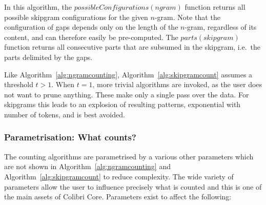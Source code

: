 \documentclass[a4paper,12pt]{article}
\begin{document}
In this algorithm, the $possibleConfigurations(ngram)$ function returns
all possible skipgram configurations for the given $n$-gram. Note that
the configuration of gaps depends only on the length of the $n$-gram, regardless
of its content, and can therefore easily be pre-computed. The
$parts(skipgram)$ function returns all consecutive parts that are
subsumed in the skipgram, i.e.\ the parts delimited by the gaps.

Like Algorithm~\ref{alg:ngramcounting}, Algorithm~\ref{alg:skipgramcount}
assumes a threshold $t>1$. When $t=1$, more trivial algorithms are
invoked, as the user does not want to prune anything. These make only a single
pass over the data. For skipgrams this leads to an explosion of
resulting patterns, exponential with number of tokens, and is best avoided.

\subsubsection{Parametrisation: What counts?}
\label{sec:whatcounts}

The counting algorithms are parametrised by a various other parameters which
are not shown in Algorithm~\ref{alg:ngramcounting} and
Algorithm~\ref{alg:skipgramcount} to reduce complexity. The wide variety of
parameters allow the user to influence precisely what is counted and this is one
of the main assets of Colibri Core. Parameters exist to affect the following:
\end{document}
